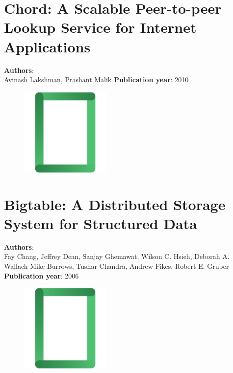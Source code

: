 \documentclass[11pt,fleqn]{book} %
\begin{document}
\chapter{Chord: A Scalable Peer-to-peer Lookup Service for Internet Applications}
\vspace*{-7mm}
\Large \textbf{Authors}: \\
Avinash Lakshman, Prashant Malik
\newline\newline
\textbf{Publication year}: 2010
\begin{figure}[b]
    \centering
    \includegraphics[width=0.4\textwidth]{distributed-systems-rectangle.pdf}
\end{figure}


\chapter{Bigtable: A Distributed Storage System for Structured Data}
\vspace*{-7mm}
\Large \textbf{Authors}: \\
Fay Chang, Jeffrey Dean, Sanjay Ghemawat, Wilson C. Hsieh, Deborah A. Wallach Mike Burrows, Tushar Chandra, Andrew Fikes, Robert E. Gruber
\newline\newline
\textbf{Publication year}: 2006
\begin{figure}[b]
    \centering
    \includegraphics[width=0.4\textwidth]{distributed-systems-rectangle.pdf}
\end{figure}

\end{document}
